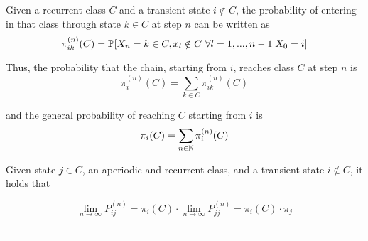 	\begin{definition}[lesson 22/03/17] \label{def:falling_probability}
		Given a recurrent class $C$ and a transient state $i \notin C$, the probability of entering in that class through state $k \in C$ at step $n$ can be written as
		$$ \pi_{ik}^{(n)}(C) = \mathbb{P}[X_n = k \in C, x_l \notin C ~ \forall l=1, ..., n-1 | X_0 = i] $$

		Thus, the probability that the chain, starting from $i$, reaches class $C$ at step $n$ is
		$$ \pi_{i}^{(n)}(C) = \sum_{k \in C} \pi_{ik}^{(n)}(C) $$

		and the general probability of reaching $C$ starting from $i$ is
		$$ \pi_i(C) = \sum_{n \in \mathbb{N}} \pi_i^{(n)}(C) $$
	\end{definition}

	\begin{theorem}[3.1, KT p. 91] \label{th:3.1}
		Given state $j \in C$, an aperiodic and recurrent class, and a transient state $i \notin C$, it holds that

		$$ \lim_{n \to \infty } P_{ij}^{(n)} = \pi_i(C) \cdot \lim_{n \to \infty } P_{jj}^{(n)} = \pi_i(C) \cdot \pi_j $$
	\end{theorem}
	---
